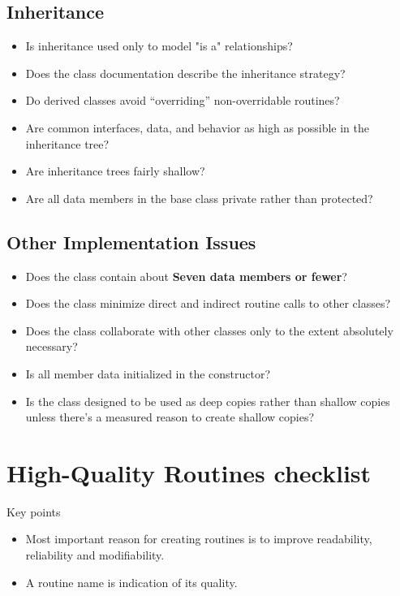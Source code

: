 \subsection{Inheritance}
\begin{itemize}
\item Is inheritance used only to model "is a" relationships?
\item Does the class documentation describe the inheritance strategy?
\item Do derived classes avoid “overriding” non-overridable routines? 
\item Are common interfaces, data, and behavior as high as possible in the inheritance tree? 
\item Are inheritance trees fairly shallow? 
\item Are all data members in the base class private rather than protected? 
\end{itemize}

\subsection{Other Implementation Issues}
\begin{itemize}
\item Does the class contain about \textbf{Seven data members or fewer}?
\item Does the class minimize direct and indirect routine calls to other classes?
\item Does the class collaborate with other classes only to the extent absolutely necessary? 
\item Is all member data initialized in the constructor? 
\item Is the class designed to be used as deep copies rather than shallow copies unless there’s a measured reason to create shallow copies? 
\end{itemize}

\newpage
\section{High-Quality Routines checklist}
Key points
\begin{itemize}
\item Most important reason for creating routines is to improve readability, reliability and modifiability.
\item A routine name is indication of its quality.
\end{itemize}
